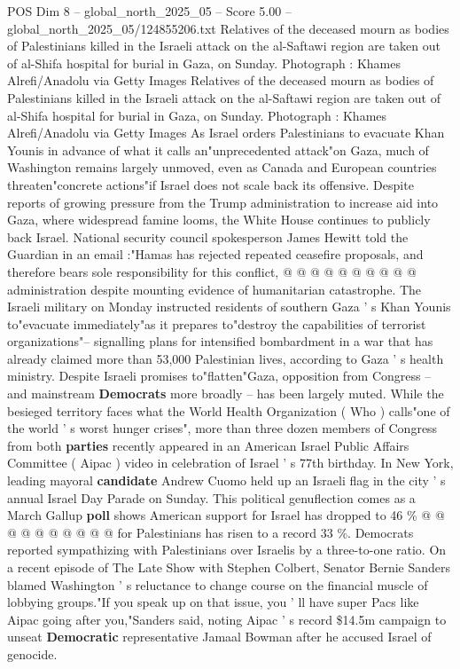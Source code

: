 \begin{textsample}{POS Dim 8 – global\_north\_2025\_05 – Score 5.00 – global\_north\_2025\_05/124855206.txt}  \label{ex:f8_pos_405}
Relatives of the deceased mourn as bodies of Palestinians killed in the Israeli attack on the al-Saftawi region are taken out of al-Shifa hospital for burial in Gaza, on Sunday.
Photograph : Khames Alrefi/Anadolu via Getty Images Relatives of the deceased mourn as bodies of Palestinians killed in the Israeli attack on the al-Saftawi region are taken out of al-Shifa hospital for burial in Gaza, on Sunday.
Photograph : Khames Alrefi/Anadolu via Getty Images As Israel orders Palestinians to evacuate Khan Younis in advance of what it calls an"unprecedented attack"on Gaza, much of Washington remains largely unmoved, even as Canada and European countries threaten"concrete actions"if Israel does not scale back its offensive.
Despite reports of growing pressure from the Trump administration to increase aid into Gaza, where widespread famine looms, the White House continues to publicly back Israel.
National security council spokesperson James Hewitt told the Guardian in an email :"Hamas has rejected repeated ceasefire proposals, and therefore bears sole responsibility for this conflict, @ @ @ @ @ @ @ @ @ @ administration despite mounting evidence of humanitarian catastrophe.
The Israeli military on Monday instructed residents of southern Gaza ' s Khan Younis to"evacuate immediately"as it prepares to"destroy the capabilities of terrorist organizations"-- signalling plans for intensified bombardment in a war that has already claimed more than 53,000 Palestinian lives, according to Gaza ' s health ministry.
Despite Israeli promises to"flatten"Gaza, opposition from Congress -- and mainstream \textbf{Democrats} more broadly -- has been largely muted.
While the besieged territory faces what the World Health Organization ( Who ) calls"one of the world ' s worst hunger crises", more than three dozen members of Congress from both \textbf{parties} recently appeared in an American Israel Public Affairs Committee ( Aipac ) video in celebration of Israel ' s 77th birthday.
In New York, leading mayoral \textbf{candidate} Andrew Cuomo held up an Israeli flag in the city ' s annual Israel Day Parade on Sunday.
This political genuflection comes as a March Gallup \textbf{poll} shows American support for Israel has dropped to 46 \% @ @ @ @ @ @ @ @ @ @ for Palestinians has risen to a record 33 \%.
Democrats reported sympathizing with Palestinians over Israelis by a three-to-one ratio.
On a recent episode of The Late Show with Stephen Colbert, Senator Bernie Sanders blamed Washington ' s reluctance to change course on the financial muscle of lobbying groups."If you speak up on that issue, you ' ll have super Pacs like Aipac going after you,"Sanders said, noting Aipac ' s record \$14.5m campaign to unseat \textbf{Democratic} representative Jamaal Bowman after he accused Israel of genocide.

\end{textsample}
